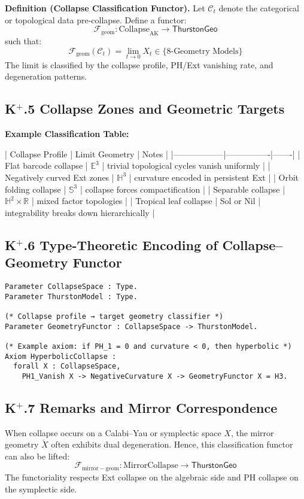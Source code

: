 \documentclass[11pt]{article}
\begin{document}
\begin{axiom}
\begin{axiom}
\textbf{Definition (Collapse Classification Functor).}  
Let \( \mathcal{C}_t \) denote the categorical or topological data pre-collapse.  
Define a functor:
\[
\mathcal{F}_{\mathrm{geom}} : \mathrm{Collapse}_{\mathrm{AK}} \to \mathsf{ThurstonGeo}
\]
such that:
\[
\mathcal{F}_{\mathrm{geom}}(\mathcal{C}_t) = \lim_{t \to 0} X_t \in \{ \text{8-Geometry Models} \}
\]
The limit is classified by the collapse profile, PH/Ext vanishing rate, and degeneration patterns.

\subsection*{K$^+$.5 Collapse Zones and Geometric Targets}

\textbf{Example Classification Table:}

| Collapse Profile | Limit Geometry | Notes |
|------------------|----------------|-------|
| Flat barcode collapse | \( \mathbb{E}^3 \) | trivial topological cycles vanish uniformly |
| Negatively curved Ext zones | \( \mathbb{H}^3 \) | curvature encoded in persistent Ext |
| Orbit folding collapse | \( \mathbb{S}^3 \) | collapse forces compactification |
| Separable collapse | \( \mathbb{H}^2 \times \mathbb{R} \) | mixed factor topologies |
| Tropical leaf collapse | Sol or Nil | integrability breaks down hierarchically |

\subsection*{K$^+$.6 Type-Theoretic Encoding of Collapse–Geometry Functor}

\begin{lstlisting}[language=Coq]
Parameter CollapseSpace : Type.
Parameter ThurstonModel : Type.

(* Collapse profile → target geometry classifier *)
Parameter GeometryFunctor : CollapseSpace -> ThurstonModel.

(* Example axiom: if PH_1 = 0 and curvature < 0, then hyperbolic *)
Axiom HyperbolicCollapse :
  forall X : CollapseSpace,
    PH1_Vanish X -> NegativeCurvature X -> GeometryFunctor X = H3.
\end{lstlisting}

\subsection*{K$^+$.7 Remarks and Mirror Correspondence}

When collapse occurs on a Calabi–Yau or symplectic space \( X \), the mirror geometry \( \check{X} \) often  
exhibits dual degeneration. Hence, this classification functor can also be lifted:
\[
\mathcal{F}_{\mathrm{mirror-geom}} : \mathrm{MirrorCollapse} \to \mathsf{ThurstonGeo}
\]
The functoriality respects Ext collapse on the algebraic side and PH collapse on the symplectic side.


\end{axiom}
\end{axiom}
\end{document}
